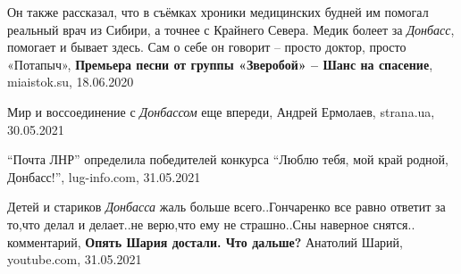  
 
 
 
 

Он также рассказал, что в съёмках хроники медицинских будней им помогал
реальный врач из Сибири, а точнее с Крайнего Севера. Медик болеет за
\emph{Донбасс}, помогает и бывает здесь. Сам о себе он говорит – просто доктор,
просто «Потапыч», \textbf{Премьера песни от группы «Зверобой» – Шанс на
спасение}, miaistok.su, 18.06.2020

Мир и воссоединение с \emph{Донбассом} еще впереди, Андрей Ермолаев, strana.ua,
30.05.2021

\enquote{Почта ЛНР} определила победителей конкурса \enquote{Люблю тебя, мой
край родной, Донбасс!}, lug-info.com, 31.05.2021

Детей и стариков \emph{Донбасса} жаль больше всего..Гончаренко все равно ответит за
то,что делал и делает..не верю,что ему не страшно..Сны наверное снятся..
комментарий, \textbf{Опять Шария достали. Что дальше?} Анатолий Шарий, youtube.com, 31.05.2021
